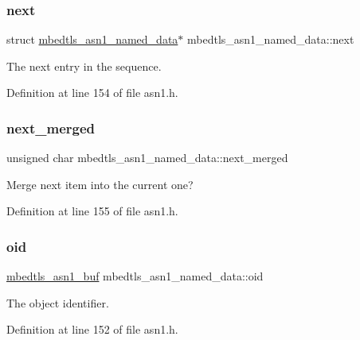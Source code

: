\subsubsection{\texorpdfstring{next}{next}}
{\footnotesize\ttfamily struct \mbox{\hyperlink{structmbedtls__asn1__named__data}{mbedtls\+\_\+asn1\+\_\+named\+\_\+data}}$\ast$ mbedtls\+\_\+asn1\+\_\+named\+\_\+data\+::next}

The next entry in the sequence. 

Definition at line 154 of file asn1.\+h.

\mbox{\label{structmbedtls__asn1__named__data_aee15b65458fa2c10596ff7c210ba4ee1}} 
\subsubsection{\texorpdfstring{next\+\_\+merged}{next\_merged}}
{\footnotesize\ttfamily unsigned char mbedtls\+\_\+asn1\+\_\+named\+\_\+data\+::next\+\_\+merged}

Merge next item into the current one? 

Definition at line 155 of file asn1.\+h.

\mbox{\label{structmbedtls__asn1__named__data_a0981fcdac0ce14b6922a953adf0624d9}} 
\subsubsection{\texorpdfstring{oid}{oid}}
{\footnotesize\ttfamily \mbox{\hyperlink{structmbedtls__asn1__buf}{mbedtls\+\_\+asn1\+\_\+buf}} mbedtls\+\_\+asn1\+\_\+named\+\_\+data\+::oid}

The object identifier. 

Definition at line 152 of file asn1.\+h.

\mbox{\label{structmbedtls__asn1__named__data_ad99636f90fae31a96c26df85a7896b07}} 
